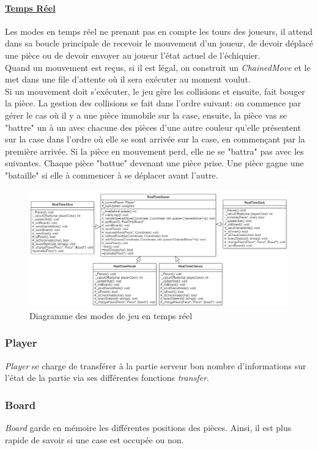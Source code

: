 \documentclass[10pt, a4paper]{article}
\begin{document}
\paragraph{\underline{Temps Réel}}
Les modes en temps réel ne prenant pas en compte les tours des joueurs, il attend dans sa boucle principale de recevoir le mouvement d'un joueur, de devoir déplacé une pièce ou de devoir envoyer au joueur l'état actuel de l'échiquier. \\
Quand un mouvement est reçus, si il est légal, on construit un \textit{ChainedMove} et le met dans une file d'attente où il sera exécuter au moment voulut. \\
Si un mouvement doit s'exécuter, le jeu gère les collisions et ensuite, fait bouger la pièce. La gestion des collisions se fait dans l'ordre suivant: on commence par gérer le cas où il y a une pièce immobile sur la case, ensuite, la pièce vas se "battre" un à un avec chacune des pièces d'une autre couleur qu'elle présentent sur la case dans l'ordre où elle se sont arrivée sur la case, en commençant par la première arrivée. Si la pièce en mouvement perd, elle ne se "battra" pas avec les suivantes. Chaque pièce "battue" devenant une pièce prise. Une pièce gagne une "bataille" si elle à commencer à se déplacer avant l'autre.
\begin{figure}[H]
\centering
\includegraphics[scale=0.5]{mode_chess_realtime.png}
\caption{Diagramme des modes de jeu en temps réel}
\end{figure}



\subsubsection{Player}
\textit{Player} se charge de transférer à la partie serveur bon nombre d'informations sur l'état de la partie via ses différentes fonctions \textit{transfer}.


\subsubsection{Board}
\textit{Board} garde en mémoire les différentes positions des pièces. Ainsi, il est plus rapide de savoir si une case est occupée ou non.
\end{document}
